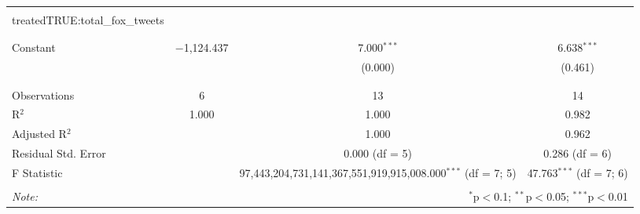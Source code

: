 \begin{table}[!htbp]
\begin{tabular}{@{\extracolsep{5pt}}lccc}
  & & & \\ 
 treatedTRUE:total\_fox\_tweets &  &  &  \\ 
  &  &  &  \\ 
  & & & \\ 
 Constant & $-$1,124.437 & 7.000$^{***}$ & 6.638$^{***}$ \\ 
  &  & (0.000) & (0.461) \\ 
  & & & \\ 
\hline \\[-1.8ex] 
Observations & 6 & 13 & 14 \\ 
R$^{2}$ & 1.000 & 1.000 & 0.982 \\ 
Adjusted R$^{2}$ &  & 1.000 & 0.962 \\ 
Residual Std. Error &  & 0.000 (df = 5) & 0.286 (df = 6) \\ 
F Statistic &  & 97,443,204,731,141,367,551,919,915,008.000$^{***}$ (df = 7; 5) & 47.763$^{***}$ (df = 7; 6) \\ 
\hline 
\hline \\[-1.8ex] 
\textit{Note:}  & \multicolumn{3}{r}{$^{*}$p$<$0.1; $^{**}$p$<$0.05; $^{***}$p$<$0.01} \\ 
\end{tabular} 
\end{table} 

